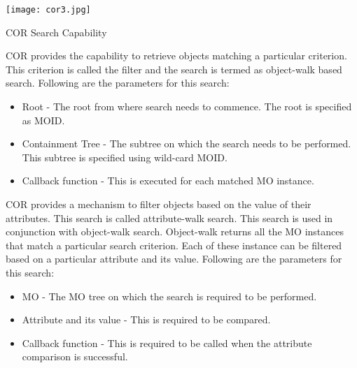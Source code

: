 \begin{flushleft}
\begin{enumerate}
\end{enumerate}
\end{flushleft}
\newpage
\begin{center}
\texttt{[image: cor3.jpg]}
\end{center}

\begin{flushleft}

\begin{Desc}
\item
[COR Search Capability]\end{Desc}
COR provides the capability to retrieve objects matching a particular criterion. This criterion is called the filter and the search is termed as 
object-walk based search. Following are the parameters for this search:
\begin{itemize}
\item
Root - The root from where search needs to commence. The root is specified as MOID.
\item
Containment Tree - The subtree on which the search needs to be performed. This subtree is specified using wild-card MOID.
\item
Callback function - This is executed for each matched MO instance.
\end{itemize}
COR provides a mechanism to filter objects based on the value of their attributes. This search is called attribute-walk search.
This search is used in conjunction with object-walk search. 
Object-walk returns all the MO instances that match a particular search criterion. Each of these instance can be filtered based on a particular 
attribute and its value. Following are the parameters for this search:
\begin{itemize}
\item
MO - The MO tree on which the search is required to be performed.
\item
Attribute and its value - This is required to be compared.
\item
Callback function - This is required to be called when the attribute comparison is successful. 
\end{itemize}


\end{flushleft}
